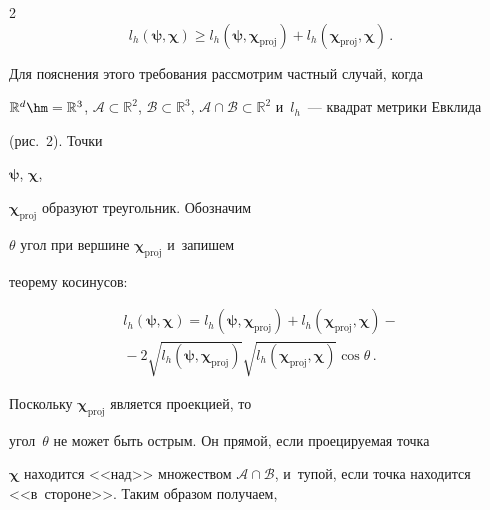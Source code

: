 \begin{multicols}{2}
$$

    l_h(\boldsymbol{\psi}, \boldsymbol{\chi}) \geq

    l_h(\boldsymbol{\psi}, \boldsymbol{\chi}_{\mathrm{proj}}) +

    l_h(\boldsymbol{\chi}_{\mathrm{proj}},

    \boldsymbol{\chi})\,.

$$



\smallskip



Для пояснения этого требования рассмотрим частный случай, когда

$\mathbb{R}^d \hm= \mathbb{R}^3$, $\mathcal{A} \subset \mathbb{R}^2$, $\mathcal{B} \subset \mathbb{R}^3$, $\mathcal{A} \cap \mathcal{B}

\subset \mathbb{R}^2$ и~$l_h$~--- квадрат метрики Евклида

(рис.~2). Точки

$\boldsymbol{\psi}$, $\boldsymbol{\chi}$,

$\boldsymbol{\chi}_{\mathrm{proj}}$ образуют треугольник. Обозначим

$\theta$ угол при вершине $\boldsymbol{\chi}_{\mathrm{proj}}$ и~запишем

теорему косинусов:

\begin{multline*}

    l_h(\boldsymbol{\psi}, \boldsymbol{\chi}) =

    l_h(\boldsymbol{\psi}, \boldsymbol{\chi}_{\mathrm{proj}}) +

    l_h(\boldsymbol{\chi}_{\mathrm{proj}},

    \boldsymbol{\chi}) - {}\\

    {}-2 \sqrt{l_h(\boldsymbol{\psi}, \boldsymbol{\chi}_{\mathrm{proj}})}

    \sqrt{l_h(\boldsymbol{\chi}_{\mathrm{proj}},

    \boldsymbol{\chi})} \cos \theta\,.

\end{multline*}





Поскольку $\boldsymbol{\chi}_{\mathrm{proj}}$ является проекцией, то

угол~$\theta$ не может быть острым. Он прямой, если проецируемая точка

$\boldsymbol{\chi}$ находится <<над>> множеством $\mathcal{A} \cap \mathcal{B}$, и~тупой, если точка находится <<в~стороне>>. Таким образом получаем,


\end{multicols}
